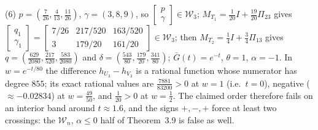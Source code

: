 \documentclass[10pt]{article}
\theoremstyle{plain}
\theoremstyle{definition}
\theoremstyle{remark}
\begin{document}
(6) $p=(\tfrac7{26},\tfrac4{13},\tfrac{11}{26})$, $\gamma=(3,8,9)$, so $[\begin{smallmatrix}p\\ \gamma\end{smallmatrix}]\in\mathcal W_3$; $M_{T_1}=\tfrac1{20}I+\tfrac{19}{20}\Pi_{23}$ gives $[\begin{smallmatrix}q_1\\ \gamma_1\end{smallmatrix}]=[\begin{smallmatrix}7/26&217/520&163/520\\ 3&179/20&161/20\end{smallmatrix}]\in\mathcal W_3$; then $M_{T_2}=\tfrac14I+\tfrac34\Pi_{13}$ gives $q=(\tfrac{629}{2080},\tfrac{217}{520},\tfrac{583}{2080})$ and $\delta=(\tfrac{543}{80},\tfrac{179}{20},\tfrac{341}{80})$; $\bar G(t)=e^{-t}$, $\theta=1$, $\alpha=-1$. In $w=e^{-t/80}$ the difference $h_{U_3}-h_{V_3}$ is a rational function whose numerator has degree $855$; its exact rational values are $\tfrac{7881}{83200}>0$ at $w=1$ (i.e.\ $t=0$), negative ($\approx-0.02834$) at $w=\tfrac{49}{50}$, and $\tfrac1{20}>0$ at $w=\tfrac12$. The claimed order therefore fails on an interior band around $t\approx1.6$, and the signs $+,-,+$ force at least two crossings: the $\mathcal W_n$, $\alpha\le0$ half of Theorem~3.9 is false as well.
\end{document}
